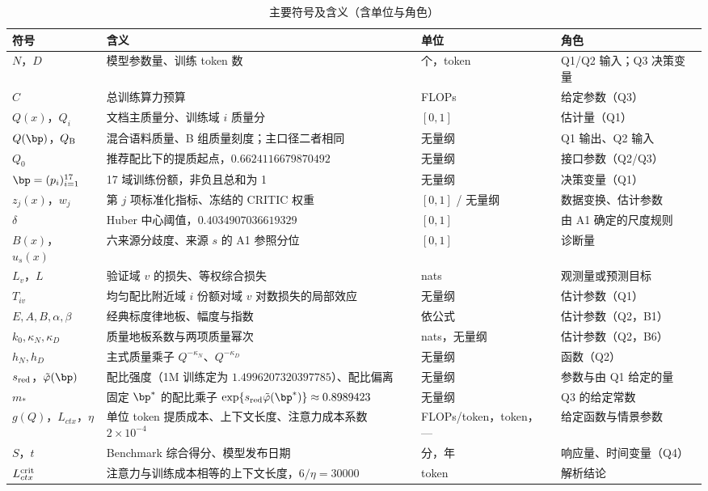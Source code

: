 \begin{table}[H]
\centering\footnotesize
\caption{主要符号及含义（含单位与角色）}
\label{tab:symbol}
\begin{tabularx}{\textwidth}{@{}p{2.5cm}X p{1.8cm}p{2.5cm}@{}}
\toprule
符号 & 含义 & 单位 & 角色 \\
\midrule
$N$，$D$ & 模型参数量、训练 token 数 & 个，token & Q1/Q2 输入；Q3 决策变量 \\
$C$ & 总训练算力预算 & FLOPs & 给定参数（Q3） \\
$Q(x)$，$Q_i$ & 文档主质量分、训练域 $i$ 质量分 & $[0,1]$ & 估计量（Q1） \\
$Q(\bp)$，$Q_{\rm B}$ & 混合语料质量、B 组质量刻度；主口径二者相同 & 无量纲 & Q1 输出、Q2 输入 \\
$Q_0$ & 推荐配比下的提质起点，$0.6624116679870492$ & 无量纲 & 接口参数（Q2/Q3） \\
$\bp=(p_i)_{i=1}^{17}$ & 17 域训练份额，非负且总和为 1 & 无量纲 & 决策变量（Q1） \\
$z_j(x)$，$w_j$ & 第 $j$ 项标准化指标、冻结的 CRITIC 权重 & $[0,1]$ / 无量纲 & 数据变换、估计参数 \\
$\delta$ & Huber 中心阈值，$0.4034907036619329$ & $[0,1]$ & 由 A1 确定的尺度规则 \\
$B(x)$，$u_s(x)$ & 六来源分歧度、来源 $s$ 的 A1 参照分位 & $[0,1]$ & 诊断量 \\
$L_v$，$L$ & 验证域 $v$ 的损失、等权综合损失 & nats & 观测量或预测目标 \\
$T_{iv}$ & 均匀配比附近域 $i$ 份额对域 $v$ 对数损失的局部效应 & 无量纲 & 估计参数（Q1） \\
$E,A,B,\alpha,\beta$ & 经典标度律地板、幅度与指数 & 依公式 & 估计参数（Q2，B1） \\
$k_0,\kappa_N,\kappa_D$ & 质量地板系数与两项质量幂次 & nats，无量纲 & 估计参数（Q2，B6） \\
$h_N,h_D$ & 主式质量乘子 $Q^{-\kappa_N}$、$Q^{-\kappa_D}$ & 无量纲 & 函数（Q2） \\
$s_{\rm red}$，$\tilde\varphi(\bp)$ & 配比强度（1M 训练定为 $1.4996207320397785$）、配比偏离 & 无量纲 & 参数与由 Q1 给定的量 \\
$m_*$ & 固定 $\bp^*$ 的配比乘子 $\exp\{s_{\rm red}\tilde\varphi(\bp^*)\}\approx0.8989423$ & 无量纲 & Q3 的给定常数 \\
$g(Q)$，$L_{ctx}$，$\eta$ & 单位 token 提质成本、上下文长度、注意力成本系数 $2\times10^{-4}$ & FLOPs/token，token，— & 给定函数与情景参数 \\
$S$，$t$ & Benchmark 综合得分、模型发布日期 & 分，年 & 响应量、时间变量（Q4） \\
$L_{ctx}^{\rm crit}$ & 注意力与训练成本相等的上下文长度，$6/\eta=30000$ & token & 解析结论 \\
\bottomrule
\end{tabularx}
\end{table}

